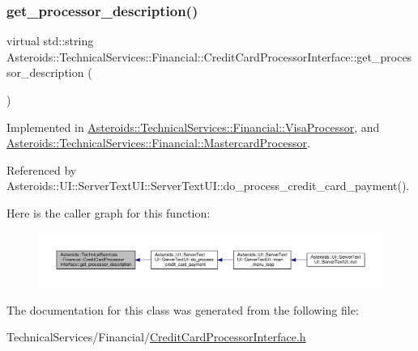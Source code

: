 \subsubsection{\texorpdfstring{get\+\_\+processor\+\_\+description()}{get\_processor\_description()}}
{\footnotesize\ttfamily virtual std\+::string Asteroids\+::\+Technical\+Services\+::\+Financial\+::\+Credit\+Card\+Processor\+Interface\+::get\+\_\+processor\+\_\+description (\begin{DoxyParamCaption}{ }\end{DoxyParamCaption})\hspace{0.3cm}{\ttfamily [pure virtual]}}



Implemented in \hyperlink{classAsteroids_1_1TechnicalServices_1_1Financial_1_1VisaProcessor_a867ad9ef829698dc57e3f71ab7778945}{Asteroids\+::\+Technical\+Services\+::\+Financial\+::\+Visa\+Processor}, and \hyperlink{classAsteroids_1_1TechnicalServices_1_1Financial_1_1MastercardProcessor_a3dc222f21a228d61b581af1dbbd6e93b}{Asteroids\+::\+Technical\+Services\+::\+Financial\+::\+Mastercard\+Processor}.



Referenced by Asteroids\+::\+U\+I\+::\+Server\+Text\+U\+I\+::\+Server\+Text\+U\+I\+::do\+\_\+process\+\_\+credit\+\_\+card\+\_\+payment().

Here is the caller graph for this function\+:\nopagebreak
\begin{figure}[H]
\begin{center}
\leavevmode
\includegraphics[width=350pt]{classAsteroids_1_1TechnicalServices_1_1Financial_1_1CreditCardProcessorInterface_a8dcf97d20a9de55d04e0f84b4a788f78_icgraph}
\end{center}
\end{figure}


The documentation for this class was generated from the following file\+:\begin{DoxyCompactItemize}
\item 
Technical\+Services/\+Financial/\hyperlink{CreditCardProcessorInterface_8h}{Credit\+Card\+Processor\+Interface.\+h}\end{DoxyCompactItemize}
